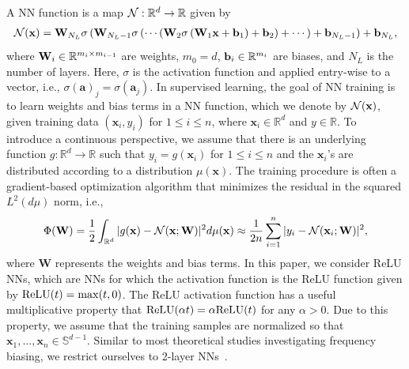 \documentclass{article} %
\begin{document}
A NN function is a map ${\mathcal{N}} : \mathbb{R}^d \rightarrow \mathbb{R}$ given by 
\begin{align*}
    {\mathcal{N}}(\mathbf{x}) = \mathbf{W}_{N_L}\sigma\left( \mathbf{W}_{N_L-1}\sigma\left(\cdots\left( \mathbf{W}_2\sigma\left(\mathbf{W}_1\mathbf{x} + {\mathbf{b}_1}\right) + {\mathbf{b}_2}\right)+\cdots\right) + {\mathbf{b}_{N_L-1}}\right) + {\mathbf{b}_{N_L}},
\end{align*}
where $\mathbf{W}_{i} \in \mathbb{R}^{m_{i}\times m_{i-1}}$ are weights, $m_0 = d$, $\mathbf{b}_i \in \mathbb{R}^{m_i}$ are biases, and $N_L$ is the number of layers. Here,
$\sigma$ is the activation function and applied entry-wise to a vector, i.e., $\sigma(\mathbf a)_j = \sigma( \mathbf{a}_{j})$. In supervised learning, the goal of NN training is to learn weights and bias terms in a NN function, which we denote by ${\mathcal{N}}(\mathbf x)$, given training data $(\mathbf{x}_i,y_i)$ for $1\leq i\leq n$, where $\mathbf{x}_i\in\mathbb{R}^d$ and $y\in\mathbb{R}$. To introduce a continuous perspective, we assume that there is an underlying function $g: \mathbb{R}^d\rightarrow \mathbb{R}$ such that $y_i = g(\mathbf{x}_i)$ for $1\leq i\leq n$ and the $\mathbf{x}_i$'s are distributed according to a distribution $\mu(\mathbf{x})$. The training procedure is often a gradient-based optimization algorithm that minimizes the residual in the squared $L^2(d\mu)$ norm, i.e.,  
\begin{equation}\label{eq:framework1}
    \Phi(\mathbf{W}) = \frac{1}{2}   \int_{\mathbb{R}^d}  | g(\mathbf{x}) - {\mathcal{N}}(\mathbf{x};\mathbf{W})|^2 d\mu(\mathbf{x}) \approx \frac{1}{2n} \sum_{i=1}^n  |y_i - {\mathcal{N}}(\mathbf{x}_i;\mathbf{W})|^2,
\end{equation}
where $\mathbf{W}$ represents the weights and bias terms. In this paper, we consider ReLU NNs, which are NNs for which the activation function is the ReLU function given by ${\rm ReLU}(t) = \max(t,0)$. The ReLU activation function has a useful multiplicative property that ${\rm ReLU}(\alpha t) = \alpha {\rm ReLU}(t)$ for any $\alpha > 0$. Due to this property, we assume that the training samples are normalized so that $\mathbf{x}_1,\ldots,\mathbf{x}_n\in\mathbb{S}^{d-1}$. Similar to most theoretical studies investigating frequency biasing, we restrict ourselves to 2-layer NNs~\citep{arora,basri,suyang,cao2019towards}.
\end{document}
